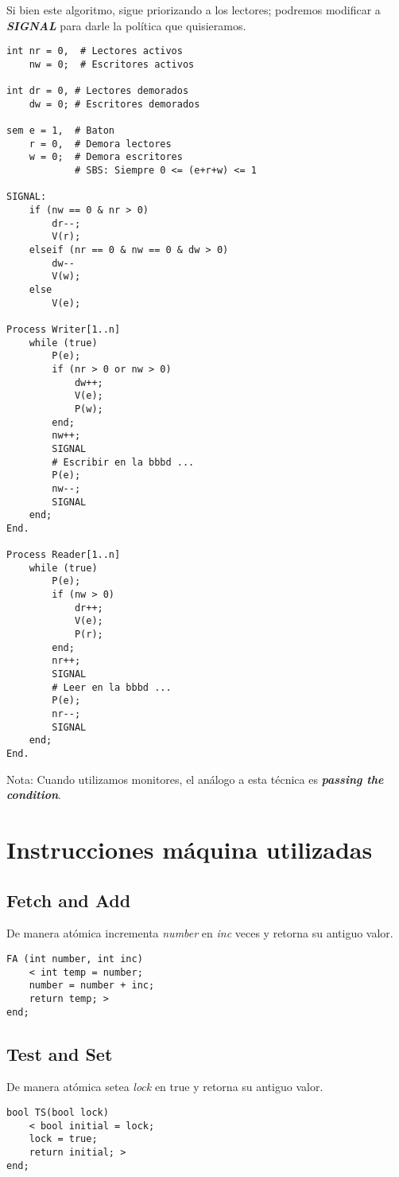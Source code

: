 \documentclass[a4paper, 10pt, margin=0in]{report}
\begin{document}
Si bien este algoritmo, sigue priorizando a los lectores; podremos modificar a \textbf{\emph{SIGNAL}} para darle la política que quisieramos.

\begin{lstlisting}
int nr = 0,  # Lectores activos
    nw = 0;  # Escritores activos

int dr = 0, # Lectores demorados
    dw = 0; # Escritores demorados

sem e = 1,  # Baton
    r = 0,  # Demora lectores
    w = 0;  # Demora escritores
            # SBS: Siempre 0 <= (e+r+w) <= 1

SIGNAL:
    if (nw == 0 & nr > 0)
        dr--;
        V(r);
    elseif (nr == 0 & nw == 0 & dw > 0)
        dw--
        V(w);
    else
        V(e);

Process Writer[1..n]
    while (true)
        P(e);
        if (nr > 0 or nw > 0)
            dw++;
            V(e);
            P(w);
        end;
        nw++;
        SIGNAL
        # Escribir en la bbbd ...
        P(e);
        nw--;
        SIGNAL
    end;
End.

Process Reader[1..n]
    while (true)
        P(e);
        if (nw > 0)
            dr++;
            V(e);
            P(r);
        end;
        nr++;
        SIGNAL
        # Leer en la bbbd ...
        P(e);
        nr--;
        SIGNAL
    end;
End.
\end{lstlisting}

Nota: Cuando utilizamos monitores, el análogo a esta técnica es \textbf{\emph{passing the condition}}.

\section{Instrucciones máquina utilizadas}

\subsection{Fetch and Add}
De manera atómica incrementa \emph{number} en \emph{inc} veces y retorna su antiguo valor.

\begin{lstlisting}
FA (int number, int inc)
    < int temp = number;
    number = number + inc;
    return temp; >
end;
\end{lstlisting}

\subsection{Test and Set}

De manera atómica setea \emph{lock} en true y retorna su antiguo valor.

\begin{lstlisting}
bool TS(bool lock)
    < bool initial = lock; 
    lock = true; 
    return initial; >
end;
\end{lstlisting}
\end{document}

